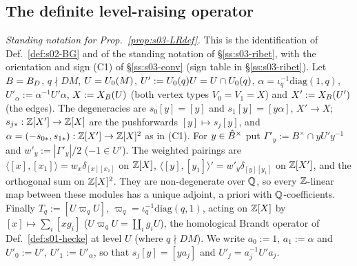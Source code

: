 \subsection*{The definite level-raising operator}

\emph{Standing notation for Prop.~\ref{prop:s03-LRdef}.} This is the identification of Def.~\ref{def:s02-BG} and of the standing notation of
\S\ref{ss:s03-ribet}, with the orientation and sign (C1) of \S\ref{ss:s03-conv} (sign table in \S\ref{ss:s03-ribet}). Let $B=B_D$, $q\nmid DM$,
$U=U_0(M)$, $U':=U_0(q)U=U\cap U_0(q)$, $\alpha=\iota_q^{-1}\mathrm{diag}(1,q)$, $U'_\alpha:=\alpha^{-1}U'\alpha$, $X:=X_B(U)$ (both vertex types
$V_0=V_1=X$) and $X':=X_B(U')$ (the edges). The degeneracies are $s_0[y]=[y]$ and $s_1[y]=[y\alpha]$, $X'\to X$; $s_{j*}:\mathbb{Z}[X']\to\mathbb{Z}[X]$ are the
pushforwards $[y]\mapsto s_j[y]$, and $\alpha=(-s_{0*},s_{1*}):\mathbb{Z}[X']\to\mathbb{Z}[X]^2$ as in (C1). For $y\in\hat{B}^\times$ put $\Gamma'_y:=B^\times\cap yU'y^{-1}$ and
$w'_y:=|\Gamma'_y|/2$ ($-1\in U'$). The weighted pairings are $\langle[x],[x_1]\rangle=w_x\delta_{[x][x_1]}$ on $\mathbb{Z}[X]$,
$\langle[y],[y_1]\rangle'=w'_y\delta_{[y][y_1]}$ on $\mathbb{Z}[X']$, and the orthogonal sum on $\mathbb{Z}[X]^2$. They are non-degenerate over $\mathbb{Q}$, so every
$\mathbb{Z}$-linear map between these modules has a unique adjoint, a priori with $\mathbb{Q}$-coefficients. Finally $T_q:=[U\varpi_qU]$, $\varpi_q=\iota_q^{-1}\mathrm{diag}(q,1)$,
acting on $\mathbb{Z}[X]$ by $[x]\mapsto\sum_i[xg_i]$ ($U\varpi_qU=\coprod_ig_iU$), the homological Brandt operator of Def.~\ref{def:s01-hecke} at level $U$ (where
$q\nmid DM$). We write $a_0:=1$, $a_1:=\alpha$ and $U'_0:=U'$, $U'_1:=U'_\alpha$, so that $s_j[y]=[ya_j]$ and $U'_j=a_j^{-1}U'a_j$.

